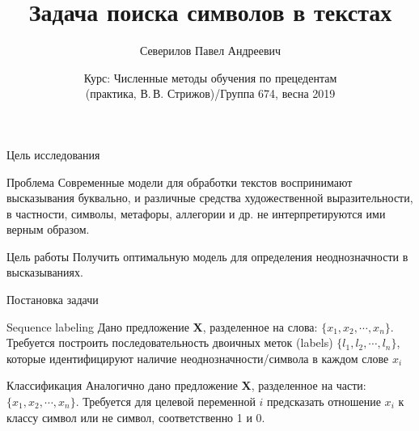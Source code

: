 \documentclass{beamer}
\title[Short title]{Задача поиска символов в текстах} %
\author{Северилов Павел Андреевич} %
\institute[Московский физико-технический институт] %
{
Московский физико-технический институт \\ %
\medskip
}
\date{Курс: Численные методы обучения по прецедентам \\(практика, В.\,В. Стрижов)/Группа 674, весна 2019} %
\begin{document}

	\begin{frame}
		\titlepage
	\end{frame}
	
	\begin{frame}{Цель исследования}
	\begin{block}{Проблема}
		Современные модели для обработки текстов воспринимают высказывания буквально, и различные средства художественной выразительности, в частности, символы, метафоры, аллегории и др. не интерпретируются ими верным образом.
	\end{block}
	
	\begin{block}{Цель работы}
		Получить оптимальную модель для определения неоднозначности в высказываниях.
	\end{block}
	
	\end{frame}
	\begin{frame}{Постановка задачи}
			\begin{block}{Sequence labeling} Дано предложение \textbf{X}, разделенное на слова: $\{x_1, x_2, \cdots, x_n\}$. Требуется построить последовательность двоичных меток (labels) $\{l_1, l_2, \cdots, l_n\}$, которые идентифицируют наличие неоднозначности/символа в каждом слове  $x_i$
			\end{block}
		
			\begin{block}{Классификация} Аналогично дано предложение \textbf{X}, разделенное на части: $\{x_1, x_2, \cdots, x_n\}$. Требуется для целевой переменной $i$ предсказать отношение $x_i$ к классу символ или не символ, соответственно 1 и 0. 
			\end{block}
	\end{frame}
\end{document}
